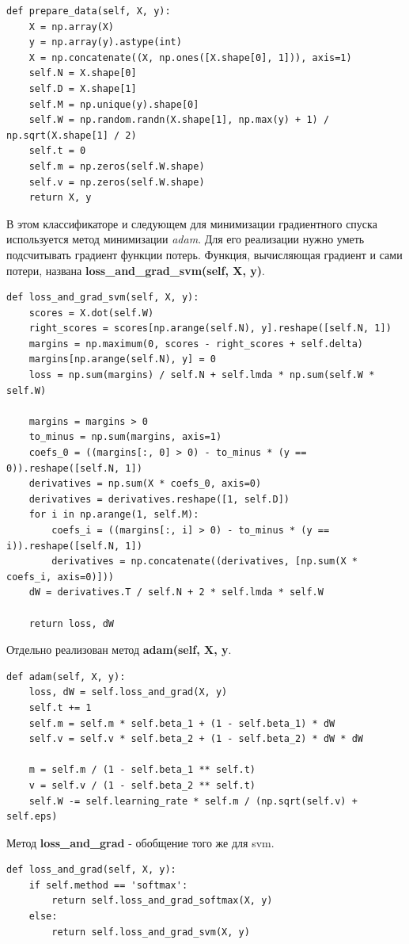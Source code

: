 \documentclass[a4paper]{article}
\begin{document}
\begin{lstlisting}
def prepare_data(self, X, y):
	X = np.array(X)
	y = np.array(y).astype(int)
	X = np.concatenate((X, np.ones([X.shape[0], 1])), axis=1)
	self.N = X.shape[0]
	self.D = X.shape[1]
	self.M = np.unique(y).shape[0]
	self.W = np.random.randn(X.shape[1], np.max(y) + 1) / np.sqrt(X.shape[1] / 2)
	self.t = 0
	self.m = np.zeros(self.W.shape)
	self.v = np.zeros(self.W.shape)
	return X, y
\end{lstlisting}

В этом классификаторе и следующем для минимизации градиентного спуска используется метод минимизации \textit{adam}. Для его реализации нужно уметь подсчитывать градиент функции потерь. Функция, вычисляющая градиент и сами потери, названа \textbf{loss\_and\_grad\_svm(self, X, y)}.
\begin{lstlisting}
def loss_and_grad_svm(self, X, y):
	scores = X.dot(self.W)
	right_scores = scores[np.arange(self.N), y].reshape([self.N, 1])
	margins = np.maximum(0, scores - right_scores + self.delta)
	margins[np.arange(self.N), y] = 0
	loss = np.sum(margins) / self.N + self.lmda * np.sum(self.W * self.W)
        
	margins = margins > 0
	to_minus = np.sum(margins, axis=1)
	coefs_0 = ((margins[:, 0] > 0) - to_minus * (y == 0)).reshape([self.N, 1])
	derivatives = np.sum(X * coefs_0, axis=0)
	derivatives = derivatives.reshape([1, self.D])
	for i in np.arange(1, self.M):
		coefs_i = ((margins[:, i] > 0) - to_minus * (y == i)).reshape([self.N, 1])
		derivatives = np.concatenate((derivatives, [np.sum(X * coefs_i, axis=0)]))
	dW = derivatives.T / self.N + 2 * self.lmda * self.W
        
	return loss, dW
\end{lstlisting}

Отдельно реализован метод \textbf{adam(self, X, y}. 
\begin{lstlisting}
def adam(self, X, y):
	loss, dW = self.loss_and_grad(X, y)
	self.t += 1
	self.m = self.m * self.beta_1 + (1 - self.beta_1) * dW
	self.v = self.v * self.beta_2 + (1 - self.beta_2) * dW * dW
        
	m = self.m / (1 - self.beta_1 ** self.t)
	v = self.v / (1 - self.beta_2 ** self.t)
	self.W -= self.learning_rate * self.m / (np.sqrt(self.v) + self.eps)
\end{lstlisting}

Метод \textbf{loss\_and\_grad} - обобщение того же для svm.
\begin{lstlisting}
def loss_and_grad(self, X, y):
	if self.method == 'softmax':
		return self.loss_and_grad_softmax(X, y)
	else:
		return self.loss_and_grad_svm(X, y)
\end{lstlisting}
\end{document}
